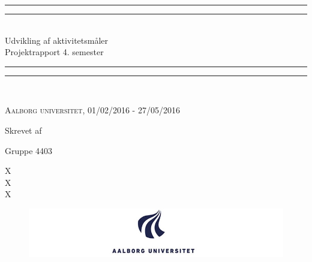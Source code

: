 \clearpage
\thispagestyle{empty}




\begin{center}
	\vspace*{\baselineskip}
	\rule{\textwidth}{1.6pt}\vspace*{-\baselineskip}\vspace*{2pt} %
	\rule{\textwidth}{0.4pt}\\[\baselineskip] %
	
	{\huge Udvikling af aktivitetsmåler\\[0.3\baselineskip] \LARGE Projektrapport 4. semester}\\[0.2\baselineskip] %
	
	\rule{\textwidth}{0.4pt}\vspace*{-\baselineskip}\vspace{3.2pt} %
	\rule{\textwidth}{1.6pt}\\[\baselineskip] %
	\vspace*{3\baselineskip}
	
	\scshape %
	Aalborg universitet,  01/02/2016 - 27/05/2016 \par %
	
	\vspace*{2\baselineskip} %
	
	Skrevet af \\
	{\Large Gruppe 4403\par}
\end{center} %
{\color{white}X \\ X \\ X \\}
\begin{figure}[H]
	\centering
	\begin{minipage}[b]{1\textwidth}
		\includegraphics[width=1.05\textwidth]{figures/aaulogo2.JPG}
	\end{minipage}
	\hfill
\end{figure}

